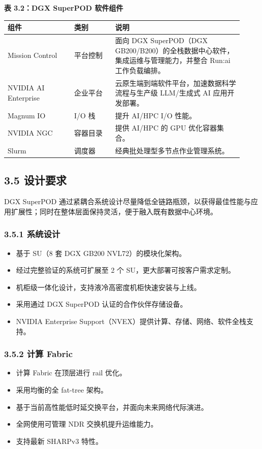 \documentclass[10pt]{article}
\newcounter{none}
\begin{document}
\textbf{表 3.2：DGX SuperPOD 软件组件}

{\def\LTcaptype{none}
\begin{longtable}{|p{0.26\linewidth}|p{0.16\linewidth}|p{0.5\linewidth}|}
\hline
\textbf{组件} & \textbf{类别} & \textbf{说明} \\
\hline
Mission Control & 平台控制 & 面向 DGX SuperPOD（DGX GB200/B200）的全栈数据中心软件，集成运维与管理能力，并整合 Run:ai 工作负载编排。 \\
\hline
NVIDIA AI Enterprise & 企业平台 & 云原生端到端软件平台，加速数据科学流程与生产级 LLM/生成式 AI 应用开发部署。 \\
\hline
Magnum IO & I/O 栈 & 提升 AI/HPC I/O 性能。 \\
\hline
NVIDIA NGC & 容器目录 & 提供 AI/HPC 的 GPU 优化容器集合。 \\
\hline
Slurm & 调度器 & 经典批处理型多节点作业管理系统。 \\
\hline
\end{longtable}
}

\subsection{3.5 设计要求}
DGX SuperPOD 通过紧耦合系统设计尽量降低全链路瓶颈，以获得最佳性能与应用扩展性；同时在整体层面保持灵活，便于融入既有数据中心环境。

\subsubsection{3.5.1 系统设计}
\begin{itemize}
\item 基于 SU（8 套 DGX GB200 NVL72）的模块化架构。
\item 经过完整验证的系统可扩展至 2 个 SU，更大部署可按客户需求定制。
\item 机柜级一体化设计，支持液冷高密度机柜快速安装与上线。
\item 采用通过 DGX SuperPOD 认证的合作伙伴存储设备。
\item NVIDIA Enterprise Support（NVEX）提供计算、存储、网络、软件全栈支持。
\end{itemize}

\subsubsection{3.5.2 计算 Fabric}
\begin{itemize}
\item 计算 Fabric 在顶层进行 rail 优化。
\item 采用均衡的全 fat-tree 架构。
\item 基于当前高性能低时延交换平台，并面向未来网络代际演进。
\item 全网使用可管理 NDR 交换机提升运维能力。
\item 支持最新 SHARPv3 特性。
\end{itemize}
\end{document}

